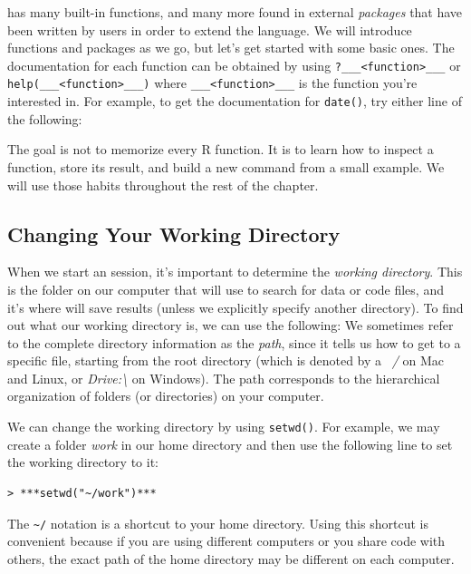 \R has many built-in functions, and many more found in external 
\emph{packages}  that have been written by \R users in order to extend
the language. We will introduce functions and packages as we go, but
let's get started with some basic ones.
The documentation for each function can be obtained by using 
\lstinline{?___<function>___} or \lstinline{help(___<function>___)} where 
\lstinline{___<function>___} is the function you're interested in. For example,
to get the documentation for \lstinline{date()}, try either line of the following:


The goal is not to memorize every R function. It is to learn how to inspect a
function, store its result, and build a new command from a small example. We
will use those habits throughout the rest of the chapter.

\subsection{Changing Your Working Directory}
When we start an \R session, it's important to determine the \emph{working directory}.
This is the folder on our computer that \R will use to search for data or code files, 
and it's where \R will save results (unless we explicitly specify another directory).
To find out what our working directory is, we can use the following:
We sometimes refer to the complete directory information as the \emph{path},
since it tells us how to get to a specific file, starting from the root
directory (which is denoted by a ~\emph{\slash} on Mac and Linux, or  
\emph{Drive:\textbackslash} on Windows). The path corresponds to the hierarchical
organization of folders (or directories) on your computer.


We can change the working directory by using 
\lstinline{setwd()}.  For example, we may create a folder \emph{work} in our home
directory and then use the following line to set the working directory to it:
\begin{lstlisting}
> ***setwd("~/work")***
\end{lstlisting}
The \lstinline{~/} notation is a shortcut to your home directory. Using this shortcut is
convenient because if you are using different computers or you share code with others,
the exact path of the home directory may be different on each computer.


